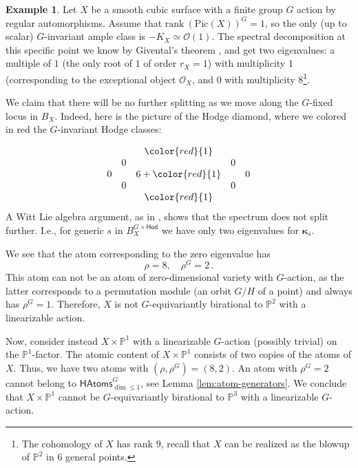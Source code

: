 \documentclass[12pt,a4paper]{amsart}
\theoremstyle{definition}
\newtheorem{example}[theorem]{Example}
\theoremstyle{remark}
\newcommand{\PP}{\mathbb{P}}
\begin{document}
\begin{example}\label{ex:cubic-surface}
    Let $X$ be a smooth cubic surface with a finite group $G$ action by regular automorphisms. Assume that $\mathrm{rank}~(\mathrm{Pic}(X))^{G}=1$, so the only (up to  scalar) $G$-invariant ample class is $-K_X\simeq \mathcal O(1)$. The spectral decomposition at this specific point we know by Givental's theorem \cite{Givental}, and get two eigenvalues: a multiple of $1$ (the only root of $1$ of order $r_X=1$) with multiplicity $1$ (corresponding to the exceptional object $\mathcal O_X$, and $0$ with multiplicity $8$\footnote{The cohomology of $X$ has rank $9$, recall that $X$ can be realized as the blowup of $\mathbb P^2$ in $6$ general points.}.

   We claim that there will be no further splitting as we move along the $G$-fixed locus in $B_X$. 
   Indeed, here is the  picture of the Hodge diamond, where we colored in red the $G$-invariant Hodge classes:

    \[
\begin{array}{ccccc}
 & & \color{red}{1} & & \\
 & 0 & & 0 & \\
 0 & & 6+\color{red}{1} & & 0 \\
 & 0 & & 0 & \\
 & & \color{red}{1} & &
\end{array}
\]
   A Witt Lie algebra argument, as in \cite[Remark 3.14, p. 22]{katzarkovpantevyu}, shows that the spectrum does not split further. I.e., for generic $s$ in $B_X^{G\times \mathsf{Hod}}$ we have only two eigenvalues for $\boldsymbol{\kappa}_s$. 


We see that the atom corresponding to the zero eigenvalue  has 
$$\rho=8,\quad \rho^G=2\,.$$
This atom can not be an atom of zero-dimensional variety with $G$-action, as the latter corresponds to a permutation module (an orbit $G/H$ of a point) and always has $\rho^G=1$. Therefore,  $X$ is not  $G$-equivariantly birational to $\mathbb{P}^2$ with a linearizable action.


    
    Now, consider instead $X\times \PP^1$ with a linearizable  $G$-action (possibly trivial) on the $\PP^1$-factor. The atomic content of $X\times \mathbb{P}^1$ consists of two copies of the atoms of $X$. Thus, we have two atoms with $(\rho,\rho^G)=(8,2)$. An atom with $\rho^G=2$ cannot belong to \(\mathsf{HAtoms}^{G}_{\dim \leq 1}\), see Lemma \ref{lem:atom-generators}.  We conclude that $X\times \mathbb{P}^1$ cannot be $G$-equivariantly birational to $\mathbb{P}^3$ with a linearizable $G$-action.


 \end{example}   
\end{document}
